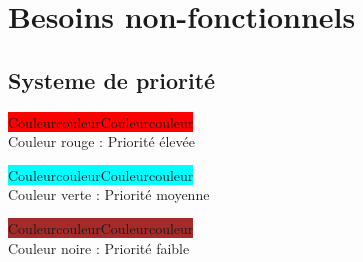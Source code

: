 \section{Besoins non-fonctionnels}

\subsection{Systeme de priorité}

\begin{center}
\colorbox{red}{\color{red}CouleurcouleurCouleurcouleur}\\ Couleur rouge : Priorité élevée \\

\bigskip

\colorbox{cyan}{\color{cyan}CouleurcouleurCouleurcouleur}\\ Couleur verte : Priorité moyenne\\

\bigskip

\colorbox{brown}{\color{brown}CouleurcouleurCouleurcouleur}\\ Couleur noire : Priorité faible 
\end{center}
 
